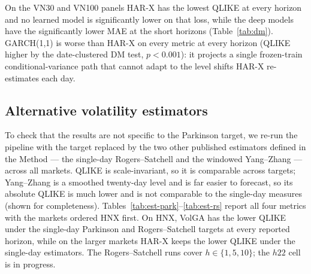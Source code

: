 \documentclass[runningheads]{llncs}
\begin{document}
\begin{table}[t]
\centering
\caption{Date-clustered DM contrasts of VolGA vs HAR-X across all markets (HNX first), on QLIKE and MAE
($p$-value; the favoured model in parentheses; bold when $p<0.05$; unadjusted).}
\label{tab:dm}
\footnotesize
\setlength{\tabcolsep}{5pt}

\end{table}

On the VN30 and VN100 panels HAR-X has the lowest QLIKE at every horizon and no learned model is significantly lower
on that loss, while the deep models have the significantly lower MAE at the short horizons (Table~\ref{tab:dm}).
GARCH(1,1) is worse than HAR-X on every metric at every horizon (QLIKE higher by the date-clustered DM test,
$p<0.001$): it projects a single frozen-train conditional-variance path that cannot adapt to the level shifts
HAR-X re-estimates each day.

\begin{table}[t]
\centering
\caption{Market ablation --- S\&P 500 (440 tickers; learned: seed mean, QLIKE $\pm$~std). Same scaling as
Table~\ref{tab:abl-vn100}.}
\label{tab:abl-sp500}
\footnotesize
\setlength{\tabcolsep}{5pt}

\end{table}

\subsection{Alternative volatility estimators}
To check that the results are not specific to the Parkinson target, we re-run the pipeline with the target
replaced by the two other published estimators defined in the Method --- the single-day Rogers--Satchell and the
windowed Yang--Zhang --- across all markets. QLIKE is scale-invariant, so it is comparable across targets;
Yang--Zhang is a smoothed twenty-day level and is far easier to forecast, so its absolute QLIKE is much lower and
is not comparable to the single-day measures (shown for completeness). Tables~\ref{tab:est-park}--\ref{tab:est-rs}
report all four metrics with the markets ordered HNX first. On HNX, VolGA has the lower QLIKE under the
single-day Parkinson and Rogers--Satchell targets at every reported horizon, while on the larger markets HAR-X
keeps the lower QLIKE under the single-day estimators. The Rogers--Satchell runs cover $h\in\{1,5,10\}$; the
$h22$ cell is in progress.
\end{document}
